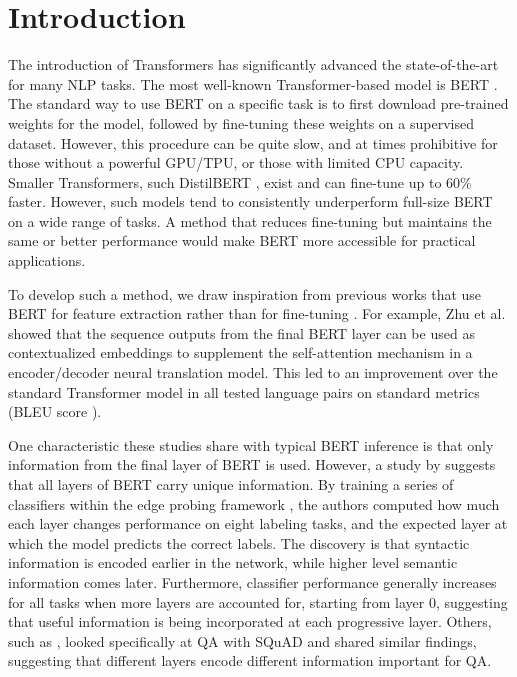 \section{Introduction}


The introduction of Transformers \cite{Vaswani2017} has significantly advanced the state-of-the-art for many NLP tasks. The most well-known Transformer-based model is BERT \cite{Devlin2019}. The standard way to use BERT on a specific task is to first download pre-trained weights for the model, followed by fine-tuning these weights on a supervised dataset. However, this procedure can be quite slow, and at times prohibitive for those without a powerful GPU/TPU, or those with limited CPU capacity. Smaller Transformers, such DistilBERT \cite{sanh2019distilbert}, exist and can fine-tune up to 60\% faster. However, such models tend to consistently underperform full-size BERT on a wide range of tasks. A method that reduces fine-tuning but maintains the same or better performance would make BERT more accessible for practical applications.

To develop such a method, we draw inspiration from previous works that use BERT for feature extraction rather than for fine-tuning \citep{Zhu2020IncorporatingBI, Chen_2020}. For example, Zhu et al. showed that the sequence outputs from the final BERT layer can be used as contextualized embeddings to supplement the self-attention mechanism in a encoder/decoder neural translation model. This led to an improvement over the standard Transformer model in all tested language pairs on standard metrics (BLEU score \cite{Papineni02bleu:a}).

One characteristic these studies share with typical BERT inference is that only information from the final layer of BERT is used. However, a study by \cite{tenney-etal-2019-bert} suggests that all layers of BERT carry unique information. By training a series of classifiers within the edge probing framework \cite{DBLP:journals/corr/abs-1905-06316}, the authors computed how much each layer changes performance on eight labeling tasks, and the expected layer at which the model predicts the correct labels. The discovery is that syntactic information is encoded earlier in the network, while higher level semantic information comes later. Furthermore, classifier performance generally increases for all tasks when more layers are accounted for, starting from layer 0, suggesting that useful information is being incorporated at each progressive layer. Others, such as \cite{Aken2020}, looked specifically at QA with SQuAD and shared similar findings, suggesting that different layers encode different information important for QA.

